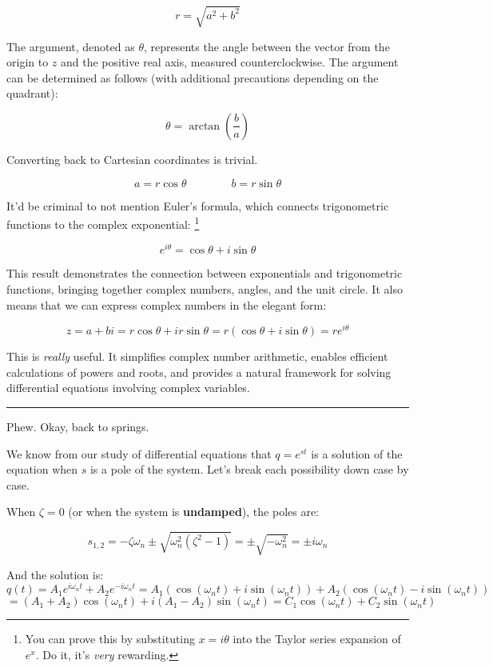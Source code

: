 \documentclass[
  letterpaper,
  DIV=11,
  numbers=noendperiod]{scrreprt}
\begin{document}
\[r = \sqrt{a^2+b^2}\]

The argument, denoted as \(\theta\), represents the angle between the
vector from the origin to \(z\) and the positive real axis, measured
counterclockwise. The argument can be determined as follows (with
additional precautions depending on the quadrant):

\[\theta = \arctan \left( \frac{b}{a} \right)\]

Converting back to Cartesian coordinates is trivial.

\[a = r \cos{\theta} \qquad \qquad b = r \sin{\theta}\]

It'd be criminal to not mention Euler's formula, which connects
trigonometric functions to the complex exponential: \footnote{You can
  prove this by substituting \(x = i \theta\) into the Taylor series
  expansion of \(e^{x}\). Do it, it's \emph{very} rewarding.}

\[e^{i\theta} = \cos{\theta} + i \sin{\theta}\]

This result demonstrates the connection between exponentials and
trigonometric functions, bringing together complex numbers, angles, and
the unit circle. It also means that we can express complex numbers in
the elegant form:

\[z = a+bi = r\cos{\theta} + i r \sin{\theta} = r (\cos{\theta} + i \sin{\theta}) = re^{i\theta}\]

This is \emph{really} useful. It simplifies complex number arithmetic,
enables efficient calculations of powers and roots, and provides a
natural framework for solving differential equations involving complex
variables.

\begin{center}\rule{0.5\linewidth}{0.5pt}\end{center}

Phew. Okay, back to springs.

We know from our study of differential equations that \(q = e^{st}\) is
a solution of the equation when \(s\) is a pole of the system. Let's
break each possibility down case by case.

When \(\zeta = 0\) (or when the system is \textbf{undamped}), the poles
are:

\[s_{1, 2} = -\zeta \omega_n \pm \sqrt{\omega_n^2 (\zeta^2 - 1)} = \pm \sqrt{-\omega_n^2 } = \pm i \omega_n\]

And the solution is:
\[q(t) = A_1 e^{i\omega_n t} + A_2 e^{- i \omega_n t} = A_1 (\cos(\omega_n t) + i \sin(\omega_n t)) + A_2 (\cos(\omega_n t) - i \sin(\omega_n t))\]
\vspace{-0.3in}
\[= (A_1 + A_2) \cos(\omega_n t) + i(A_1 - A_2) \sin(\omega_n t) = C_1 \cos(\omega_n t) + C_2 \sin(\omega_n t)\]
\end{document}
